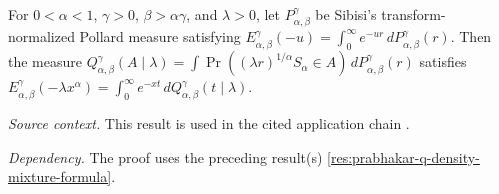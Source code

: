 \begin{proposition}
\label{res:prabhakar-q-stable-subordination-normal-form}
For \(0<\alpha<1\), \(\gamma>0\), \(\beta>\alpha\gamma\), and \(\lambda>0\), let \(P^\gamma_{\alpha,\beta}\) be Sibisi's transform-normalized Pollard measure satisfying \(E^\gamma_{\alpha,\beta}(-u)=\int_0^\infty e^{-ur}\,dP^\gamma_{\alpha,\beta}(r)\). Then the measure \(Q^\gamma_{\alpha,\beta}(A\mid\lambda)=\int\Pr((\lambda r)^{1/\alpha}S_\alpha\in A)\,dP^\gamma_{\alpha,\beta}(r)\) satisfies \(E^\gamma_{\alpha,\beta}(-\lambda x^\alpha)=\int_0^\infty e^{-xt}\,dQ^\gamma_{\alpha,\beta}(t\mid\lambda)\).

\emph{Source context.} This result is used in the cited application chain \cite{sibisi-prabhakar}.

\emph{Dependency.} The proof uses the preceding result(s) \ref{res:prabhakar-q-density-mixture-formula}.
\end{proposition}
